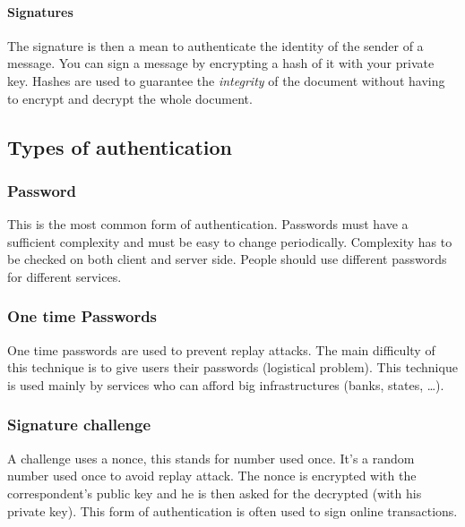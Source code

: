 \paragraph{Signatures}
The signature is then a mean to authenticate the identity of the sender of a
message.
You can sign a message by encrypting a hash of it with your private key.
 Hashes are used to guarantee the \emph{integrity} of the document
 without having to encrypt and decrypt the whole document.

\subsection{Types of authentication}

\subsubsection{Password}
This is the most common form of authentication.
Passwords must have a sufficient complexity and must be easy to change
periodically.
Complexity has to be checked on both client and server side.
People should use different passwords for different services.

\subsubsection{One time Passwords}
One time passwords are used to prevent replay attacks.
The main difficulty of this technique is to give users their passwords
(logistical problem).
This technique is used mainly by services who can afford big infrastructures
(banks, states, \ldots).

\subsubsection{Signature challenge}
A challenge uses a nonce, this stands for number used once.
It's a random number used once to avoid replay attack.
The nonce is encrypted with the correspondent's public key and he is then
asked for the decrypted (with his private key).
This form of authentication is often used to sign online transactions.

